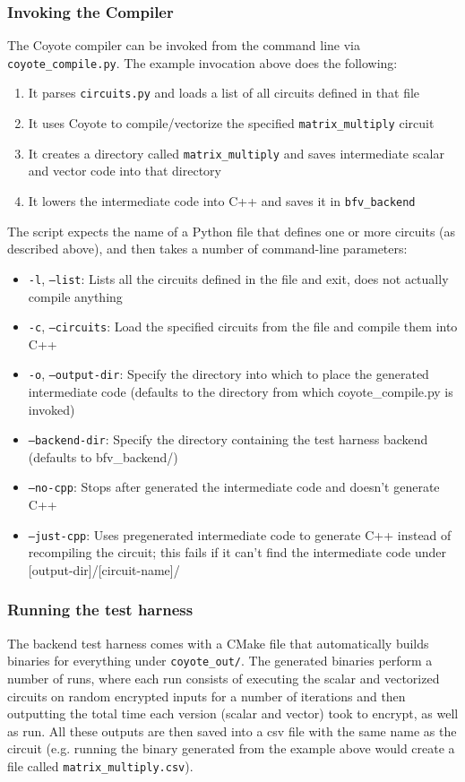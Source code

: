 \subsubsection{Invoking the Compiler}
The Coyote compiler can be invoked from the command line via {\tt coyote\_compile.py}. The example invocation above does the following:
\begin{enumerate}
    \item It parses {\tt circuits.py} and loads a list of all circuits defined in that file
    \item It uses Coyote to compile/vectorize the specified {\tt matrix\_multiply} circuit
    \item It creates a directory called {\tt matrix\_multiply} and saves intermediate scalar and vector code into that directory
    \item It lowers the intermediate code into C++ and saves it in {\tt bfv\_backend}
\end{enumerate}
The script expects the name of a Python file that defines one or more circuits (as described above), and then takes a number of command-line parameters:
\begin{itemize}
    \item {\tt -l}, {\tt --list}: Lists all the circuits defined in the file and exit, does not actually compile anything
    \item {\tt -c}, {\tt --circuits}: Load the specified circuits from the file and compile them into C++
    \item {\tt -o}, {\tt --output-dir}: Specify the directory into which to place the generated intermediate code (defaults to the directory from which coyote\_compile.py is invoked)
    \item {\tt --backend-dir}: Specify the directory containing the test harness backend (defaults to bfv\_backend/)
    \item {\tt --no-cpp}: Stops after generated the intermediate code and doesn't generate C++
    \item {\tt --just-cpp}: Uses pregenerated intermediate code to generate C++ instead of recompiling the circuit; this fails if it can't find the intermediate code under [output-dir]/[circuit-name]/
\end{itemize}
\subsubsection{Running the test harness}
The backend test harness comes with a CMake file that automatically builds binaries for everything under {\tt coyote\_out/}. The generated binaries perform a number of runs, where each run consists of executing the scalar and vectorized circuits on random encrypted inputs for a number of iterations and then outputting the total time each version (scalar and vector) took to encrypt, as well as run. All these outputs are then saved into a csv file with the same name as the circuit (e.g. running the binary generated from the example above would create a file called {\tt matrix\_multiply.csv}).

